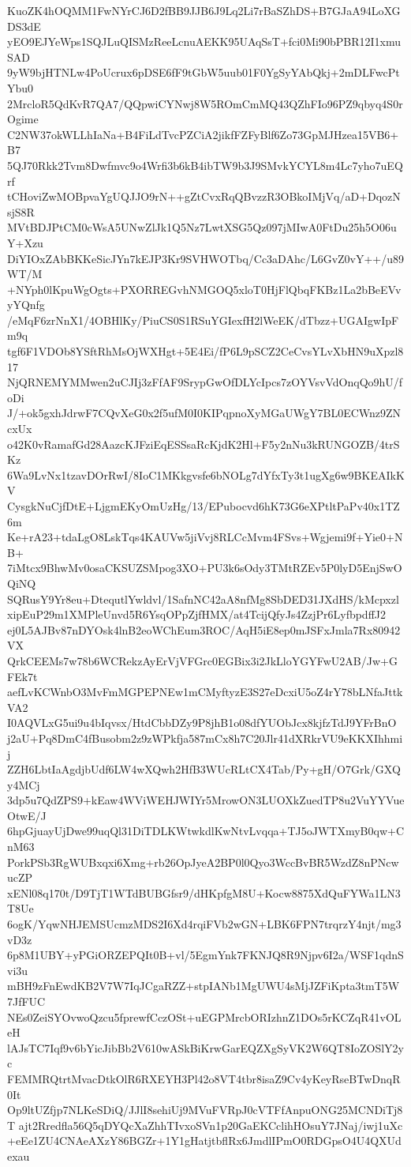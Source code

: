 KuoZK4hOQMM1FwNYrCJ6D2fBB9JJB6J9Lq2Li7rBaSZhDS+B7GJaA94LoXGDS3dE
yEO9EJYeWps1SQJLuQISMzReeLcnuAEKK95UAqSsT+fci0Mi90bPBR12I1xmuSAD
9yW9bjHTNLw4PoUcrux6pDSE6fF9tGbW5uub01F0YgSyYAbQkj+2mDLFwcPtYbu0
2MrcloR5QdKvR7QA7/QQpwiCYNwj8W5ROmCmMQ43QZhFIo96PZ9qbyq4S0rOgime
C2NW37okWLLhIaNa+B4FiLdTvcPZCiA2jikfFZFyBlf6Zo73GpMJHzea15VB6+B7
5QJ70Rkk2Tvm8Dwfmvc9o4Wrfi3b6kB4ibTW9b3J9SMvkYCYL8m4Lc7yho7uEQrf
tCHoviZwMOBpvaYgUQJJO9rN++gZtCvxRqQBvzzR3OBkoIMjVq/aD+DqozNsjS8R
MVtBDJPtCM0cWsA5UNwZlJk1Q5Nz7LwtXSG5Qz097jMIwA0FtDu25h5O06uY+Xzu
DiYIOxZAbBKKeSicJYn7kEJP3Kr9SVHWOTbq/Cc3aDAhc/L6GvZ0vY++/u89WT/M
+NYph0lKpuWgOgts+PXORREGvhNMGOQ5xloT0HjFlQbqFKBz1La2bBeEVvyYQnfg
/eMqF6zrNnX1/4OBHlKy/PiuCS0S1RSuYGIexfH2lWeEK/dTbzz+UGAIgwIpFm9q
tgf6F1VDOb8YSftRhMsOjWXHgt+5E4Ei/fP6L9pSCZ2CeCvsYLvXbHN9uXpzl817
NjQRNEMYMMwen2uCJIj3zFfAF9SrypGwOfDLYcIpcs7zOYVsvVdOnqQo9hU/foDi
J/+ok5gxhJdrwF7CQvXeG0x2f5ufM0I0KIPqpnoXyMGaUWgY7BL0ECWnz9ZNcxUx
o42K0vRamafGd28AazcKJFziEqESSsaRcKjdK2Hl+F5y2nNu3kRUNGOZB/4trSKz
6Wa9LvNx1tzavDOrRwI/8IoC1MKkgvsfe6bNOLg7dYfxTy3t1ugXg6w9BKEAIkKV
CysgkNuCjfDtE+LjgmEKyOmUzHg/13/EPubocvd6hK73G6eXPtltPaPv40x1TZ6m
Ke+rA23+tdaLgO8LskTqs4KAUVw5jiVvj8RLCcMvm4FSvs+Wgjemi9f+Yie0+NB+
7iMtcx9BhwMv0osaCKSUZSMpog3XO+PU3k6sOdy3TMtRZEv5P0lyD5EnjSwOQiNQ
SQRusY9Yr8eu+DtequtlYwldvl/1SafnNC42aA8nfMg8SbDED31JXdHS/kMcpxzl
xipEuP29m1XMPleUnvd5R6YsqOPpZjfHMX/at4TcijQfyJs4ZzjPr6LyfbpdffJ2
ej0L5AJBv87nDYOsk4lnB2eoWChEum3ROC/AqH5iE8ep0mJSFxJmla7Rx80942VX
QrkCEEMs7w78b6WCRekzAyErVjVFGrc0EGBix3i2JkLloYGYFwU2AB/Jw+GFEk7t
aefLvKCWnbO3MvFmMGPEPNEw1mCMyftyzE3S27eDcxiU5oZ4rY78bLNfaJttkVA2
I0AQVLxG5ui9u4bIqvsx/HtdCbbDZy9P8jhB1o08dfYUObJcx8kjfzTdJ9YFrBnO
j2aU+Pq8DmC4fBusobm2z9zWPkfja587mCx8h7C20Jlr41dXRkrVU9eKKXIhhmij
ZZH6LbtIaAgdjbUdf6LW4wXQwh2HfB3WUcRLtCX4Tab/Py+gH/O7Grk/GXQy4MCj
3dp5u7QdZPS9+kEaw4WViWEHJWIYr5MrowON3LUOXkZuedTP8u2VuYYVueOtwE/J
6hpGjuayUjDwe99uqQl31DiTDLKWtwkdlKwNtvLvqqa+TJ5oJWTXmyB0qw+CnM63
PorkPSb3RgWUBxqxi6Xmg+rb26OpJyeA2BP0l0Qyo3WccBvBR5WzdZ8nPNcwucZP
xENl08q170t/D9TjT1WTdBUBGfsr9/dHKpfgM8U+Kocw8875XdQuFYWa1LN3T8Ue
6ogK/YqwNHJEMSUcmzMDS2I6Xd4rqiFVb2wGN+LBK6FPN7trqrzY4njt/mg3vD3z
6p8M1UBY+yPGiORZEPQIt0B+vl/5EgmYnk7FKNJQ8R9Njpv6I2a/WSF1qdnSvi3u
mBH9zFnEwdKB2V7W7IqJCgaRZZ+stpIANb1MgUWU4sMjJZFiKpta3tmT5W7JfFUC
NEs0ZeiSYOvwoQzcu5fprewfCczOSt+uEGPMrcbORIzhnZ1DOs5rKCZqR41vOLeH
lAJsTC7Iqf9v6bYicJibBb2V610wASkBiKrwGarEQZXgSyVK2W6QT8IoZOSlY2yc
FEMMRQtrtMvacDtkOlR6RXEYH3Pl42o8VT4tbr8isaZ9Cv4yKeyRseBTwDnqR0It
Op9ltUZfjp7NLKeSDiQ/JJlI8sehiUj9MVuFVRpJ0cVTFfAnpuONG25MCNDiTj8T
ajt2Rredfla56Q5qDYQcXaZhhTIvxoSVn1p20GaEKCclihHOsuY7JNaj/iwj1uXc
+eEe1ZU4CNAeAXzY86BGZr+1Y1gHatjtbflRx6JmdlIPmO0RDGpsO4U4QXUdexau
